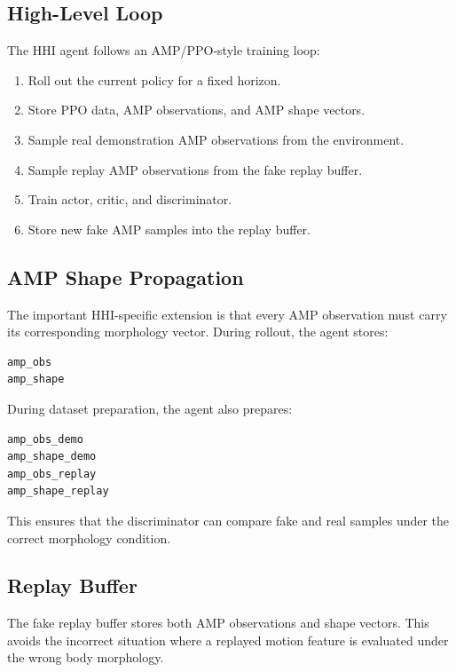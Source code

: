 \documentclass[11pt,a4paper]{article}
\begin{document}
\subsection{High-Level Loop}

The HHI agent follows an AMP/PPO-style training loop:

\begin{enumerate}[leftmargin=2em]
    \item Roll out the current policy for a fixed horizon.
    \item Store PPO data, AMP observations, and AMP shape vectors.
    \item Sample real demonstration AMP observations from the environment.
    \item Sample replay AMP observations from the fake replay buffer.
    \item Train actor, critic, and discriminator.
    \item Store new fake AMP samples into the replay buffer.
\end{enumerate}

\subsection{AMP Shape Propagation}

The important HHI-specific extension is that every AMP observation must carry its corresponding morphology vector. During rollout, the agent stores:

\begin{lstlisting}
amp_obs
amp_shape
\end{lstlisting}

During dataset preparation, the agent also prepares:

\begin{lstlisting}
amp_obs_demo
amp_shape_demo
amp_obs_replay
amp_shape_replay
\end{lstlisting}

This ensures that the discriminator can compare fake and real samples under the correct morphology condition.

\subsection{Replay Buffer}

The fake replay buffer stores both AMP observations and shape vectors. This avoids the incorrect situation where a replayed motion feature is evaluated under the wrong body morphology.
\end{document}

